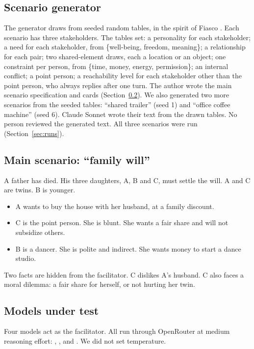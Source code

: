 \subsection{Scenario generator}
The generator draws from seeded random tables, in the spirit of Fiasco \citep{morningstar2009fiasco}.
Each scenario has three stakeholders.
The tables set:
a personality for each stakeholder; a need for each stakeholder, from \{well-being, freedom, meaning\}; a relationship for each pair; two shared-element draws, each a location or an object; one constraint per person, from \{time, money, energy, permission\}; an internal conflict; a point person; a reachability level for each stakeholder other than the point person, who always replies after one turn.
The author wrote the main scenario specification and cards (Section~\ref{sec:mainscen}).
We also generated two more scenarios from the seeded tables: ``shared trailer'' (seed 1) and ``office coffee machine'' (seed 6).
Claude Sonnet wrote their text from the drawn tables.
No person reviewed the generated text.
All three scenarios were run (Section~\ref{sec:runs}).

\subsection{Main scenario: ``family will''}
\label{sec:mainscen}
A father has died.
His three daughters, A, B and C, must settle the will.
A and C are twins.
B is younger.
\begin{itemize}
  \item A wants to buy the house with her husband, at a family discount.
  \item C is the point person.
  She is blunt.
  She wants a fair share and will not subsidize others.
  \item B is a dancer.
  She is polite and indirect.
  She wants money to start a dance studio.
\end{itemize}
Two facts are hidden from the facilitator.
C dislikes A's husband.
C also faces a moral dilemma: a fair share for herself, or not hurting her twin.

\subsection{Models under test}
Four models act as the facilitator.
All run through OpenRouter at medium reasoning effort:
, ,  and .
We did not set temperature.

